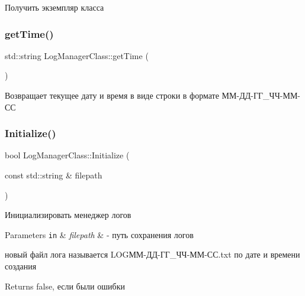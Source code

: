 Получить экземпляр класса 

\mbox{\label{class_log_manager_class_ad3626b174d18e15b33c1ebfc0eea6788}} 
\subsubsection{\texorpdfstring{get\+Time()}{getTime()}}
{\footnotesize\ttfamily std\+::string Log\+Manager\+Class\+::get\+Time (\begin{DoxyParamCaption}{ }\end{DoxyParamCaption})\hspace{0.3cm}{\ttfamily [private]}}



Возвращает текущее дату и время в виде строки в формате ММ-\/ДД-\/ГГ\+\_\+ЧЧ-\/ММ-\/СС 

\mbox{\label{class_log_manager_class_ac251900f85adb694a74b8d17f0710c86}} 
\subsubsection{\texorpdfstring{Initialize()}{Initialize()}}
{\footnotesize\ttfamily bool Log\+Manager\+Class\+::\+Initialize (\begin{DoxyParamCaption}\item[{const std\+::string \&}]{filepath }\end{DoxyParamCaption})}



Инициализировать менеджер логов 


\begin{DoxyParams}[1]{Parameters}
\mbox{\tt in}  & {\em filepath} & -\/ путь сохранения логов\\
\hline
\end{DoxyParams}
новый файл лога называется L\+O\+GММ-\/ДД-\/ГГ\+\_\+ЧЧ-\/ММ-\/СС.txt по дате и времени создания \begin{DoxyReturn}{Returns}
false, если были ошибки 
\end{DoxyReturn}
\mbox{\label{class_log_manager_class_a1487efa7d3bd59d0b13f23f244d36451}} 
